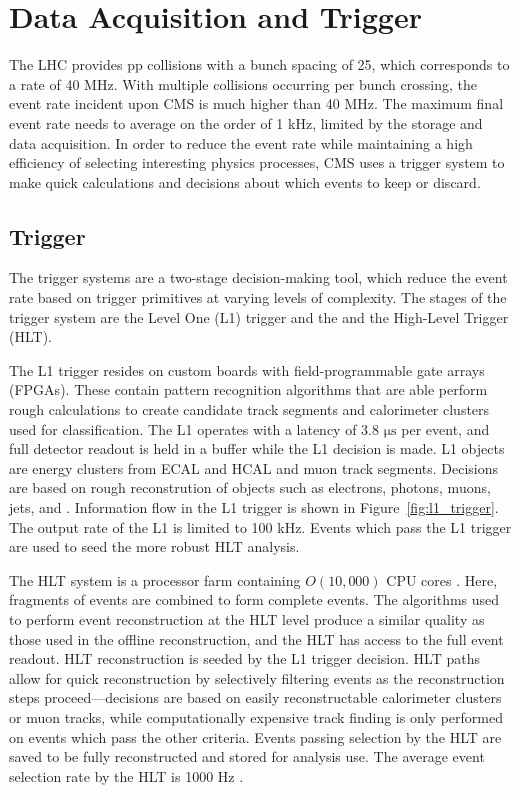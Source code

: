 \section{Data Acquisition and Trigger}
The LHC provides pp collisions with a bunch spacing of 25\ns, which corresponds to a rate of 40 MHz. With multiple collisions occurring per bunch crossing, the event rate incident upon CMS is much higher than 40 MHz. The maximum final event rate needs to average on the order of 1 kHz, limited by the storage and data acquisition. In order to reduce the event rate while maintaining a high efficiency of selecting interesting physics processes, CMS uses a trigger system to make quick calculations and decisions about which events to keep or discard. 

\subsection{Trigger}
The trigger systems are a two-stage decision-making tool, which reduce the event rate based on trigger primitives at varying levels of complexity. The stages of the trigger system are the Level One (L1) trigger and the and the High-Level Trigger (HLT)\cite{Khachatryan:2016bia}. 

The L1 trigger resides on custom boards with field-programmable gate arrays (FPGAs). These contain pattern recognition algorithms that are able perform rough calculations to create candidate track segments and calorimeter clusters used for classification. The L1 operates with a latency of 3.8 $\mathrm{\mu s}$ per event, and full detector readout is held in a buffer while the L1 decision is made. L1 objects are energy clusters from ECAL and HCAL and muon track segments. Decisions are based on rough reconstrution of objects such as electrons, photons, muons, jets, and \met.  Information flow in the L1 trigger is shown in Figure~\ref{fig:l1_trigger}. The output rate of the L1 is limited to 100 kHz. Events which pass the L1 trigger are used to seed the more robust HLT analysis\cite{Khachatryan:2016bia}. 



The HLT system is a processor farm containing $O(10,000)$ CPU cores \cite{Adam:2005zf}. Here, fragments of events are combined to form complete events. The algorithms used to perform event reconstruction at the HLT level produce a similar quality as those used in the offline reconstruction, and the HLT has access to the full event readout. HLT reconstruction is seeded by the L1 trigger decision. HLT paths allow for quick reconstruction by selectively filtering events as the reconstruction steps proceed---decisions are based on easily reconstructable calorimeter clusters or muon tracks, while computationally expensive track finding is only performed on events which pass the other criteria. Events passing selection by the HLT are saved to be fully reconstructed and stored for analysis use. The average event selection rate by the HLT is 1000 Hz \cite{Khachatryan:2016bia}. 

